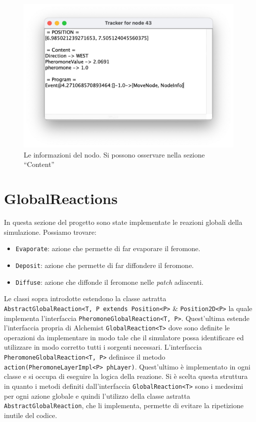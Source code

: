 \begin{figure}[ht]
    \centering
    \includegraphics[width=.7\linewidth]{figures/nodeinfo.jpg}
    \caption{Le informazioni del nodo. Si possono osservare nella sezione ``Content''}\label{fig:nodeinfo}
\end{figure}
\clearpage

\section{GlobalReactions}
In questa sezione del progetto sono state implementate le reazioni globali della simulazione. Possiamo trovare:
\begin{itemize}
    \item \texttt{Evaporate}: azione che permette di far evaporare il feromone.
    \item \texttt{Deposit}: azione che permette di far diffondere il feromone.
    \item \texttt{Diffuse}: azione che diffonde il feromone nelle \textit{patch} adiacenti.
\end{itemize}
Le classi sopra introdotte estendono la classe astratta \texttt{AbstractGlobalReaction<T, P extends Position<P>}
\& \texttt{Position2D<P>}
la quale implementa l'interfaccia \newline\texttt{PheromoneGlobalReaction<T, P>}. Quest'ultima estende l'interfaccia 
propria di Alchemist \texttt{GlobalReaction<T>} dove sono definite le operazioni da implementare in modo tale che il 
simulatore possa identificare ed utilizzare in modo corretto tutti i sorgenti necessari.
L'interfaccia \texttt{PheromoneGlobalReaction<T, P>} definisce il metodo \texttt{action(PheromoneLayerImpl<P> phLayer)}.
Quest'ultimo è implementato in ogni classe e si occupa di eseguire la logica della reazione.
Si è scelta questa struttura in quanto i metodi definiti dall'interfaccia \texttt{GlobalReaction<T>}
sono i medesimi per ogni azione globale e quindi l'utilizzo della classe astratta \texttt{AbstractGlobalReaction},
che li implementa, permette di evitare la ripetizione inutile del codice.

